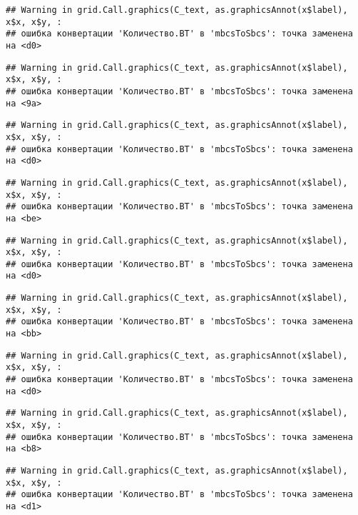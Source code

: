 \documentclass[
]{article}
\begin{document}
\begin{verbatim}
## Warning in grid.Call.graphics(C_text, as.graphicsAnnot(x$label), x$x, x$y, :
## ошибка конвертации 'Количество.ВТ' в 'mbcsToSbcs': точка заменена на <d0>
\end{verbatim}

\begin{verbatim}
## Warning in grid.Call.graphics(C_text, as.graphicsAnnot(x$label), x$x, x$y, :
## ошибка конвертации 'Количество.ВТ' в 'mbcsToSbcs': точка заменена на <9a>
\end{verbatim}

\begin{verbatim}
## Warning in grid.Call.graphics(C_text, as.graphicsAnnot(x$label), x$x, x$y, :
## ошибка конвертации 'Количество.ВТ' в 'mbcsToSbcs': точка заменена на <d0>
\end{verbatim}

\begin{verbatim}
## Warning in grid.Call.graphics(C_text, as.graphicsAnnot(x$label), x$x, x$y, :
## ошибка конвертации 'Количество.ВТ' в 'mbcsToSbcs': точка заменена на <be>
\end{verbatim}

\begin{verbatim}
## Warning in grid.Call.graphics(C_text, as.graphicsAnnot(x$label), x$x, x$y, :
## ошибка конвертации 'Количество.ВТ' в 'mbcsToSbcs': точка заменена на <d0>
\end{verbatim}

\begin{verbatim}
## Warning in grid.Call.graphics(C_text, as.graphicsAnnot(x$label), x$x, x$y, :
## ошибка конвертации 'Количество.ВТ' в 'mbcsToSbcs': точка заменена на <bb>
\end{verbatim}

\begin{verbatim}
## Warning in grid.Call.graphics(C_text, as.graphicsAnnot(x$label), x$x, x$y, :
## ошибка конвертации 'Количество.ВТ' в 'mbcsToSbcs': точка заменена на <d0>
\end{verbatim}

\begin{verbatim}
## Warning in grid.Call.graphics(C_text, as.graphicsAnnot(x$label), x$x, x$y, :
## ошибка конвертации 'Количество.ВТ' в 'mbcsToSbcs': точка заменена на <b8>
\end{verbatim}

\begin{verbatim}
## Warning in grid.Call.graphics(C_text, as.graphicsAnnot(x$label), x$x, x$y, :
## ошибка конвертации 'Количество.ВТ' в 'mbcsToSbcs': точка заменена на <d1>
\end{verbatim}
\end{document}
